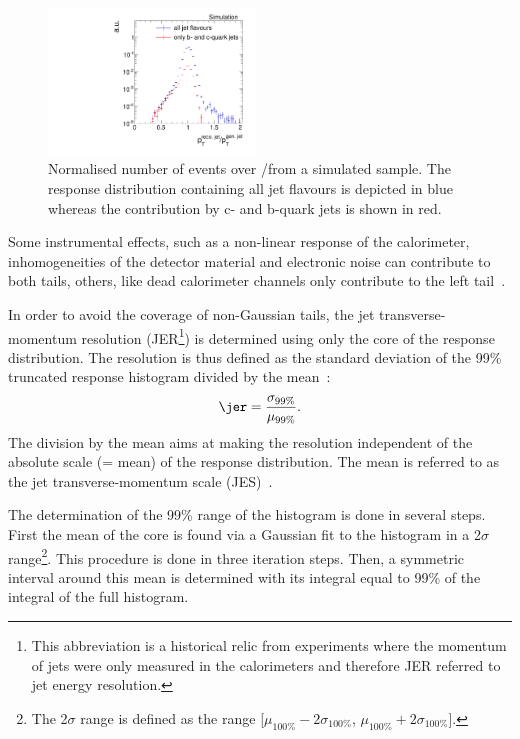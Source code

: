 \begin{figure}[!b]
  \centering
      \includegraphics[width=0.49\textwidth]{figures/resolution/generalApproach/intrinsicExampleContributionofBCQuarks.pdf}
  \caption{Normalised number of events over \ptrecojet/\ptgenjet from a simulated \GAMJET sample. 
          The response distribution containing all jet flavours is depicted in blue whereas the contribution by c- and b-quark jets is shown in red. }  
  \label{res:fig:TypicalResponse}
\end{figure}
Some instrumental effects, such as a non-linear response of the calorimeter, inhomogeneities of the detector material and electronic noise can contribute to both tails, 
others, like dead calorimeter channels only contribute to the left tail~\cite{bib:Matthias_Thesis}. 

In order to avoid the coverage of non-Gaussian tails, the jet transverse-momentum resolution (JER\footnote{This abbreviation is a historical relic from experiments where the momentum of jets were only measured in the calorimeters and therefore JER referred to jet energy resolution.}) is determined using only the core of the response distribution.
The resolution is thus defined as the standard deviation of the 99\% truncated response histogram divided by the mean~\cite{bib:CMS-AN-2010-076}:
\begin{equation*}\label{res:eq:resolutionFormula}
\jer = \frac{\sigma_{99\%}}{\mu_{99\%}}.
\end{equation*}
The division by the mean aims at making the resolution independent of the absolute scale (= mean) of the response distribution.
The mean is referred to as the jet transverse-momentum scale (JES)~\cite{bib:CMS:JERCPaper_2011}.

The determination of the 99\% range of the histogram is done in several steps. 
First the mean of the core is found via a Gaussian fit to the histogram in a 2$\sigma$ range\footnote{The 2$\sigma$ range is defined as the range [$\mu_{100\%} - 2\sigma_{100\%}$, $\mu_{100\%} + 2\sigma_{100\%}$].}. 
This procedure is done in three iteration steps.
Then, a symmetric interval around this mean is determined with its integral equal to 99\% of the integral of the full histogram. 

